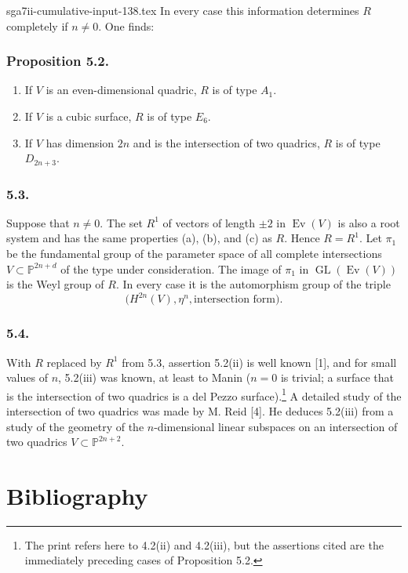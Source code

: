 \begin{filecontents*}{sga7ii-cumulative-input-138.tex}
In every case this information determines $R$ completely if $n\ne0$.  One
finds:

\subsubsection*{Proposition 5.2.}
\begin{enumerate}[label=(\roman*)]
\item If $V$ is an even-dimensional quadric, $R$ is of type $A_1$.
\item If $V$ is a cubic surface, $R$ is of type $E_6$.
\item If $V$ has dimension $2n$ and is the intersection of two quadrics,
  $R$ is of type $D_{2n+3}$.
\end{enumerate}

\subsubsection*{5.3.}
Suppose that $n\ne0$.  The set $R^1$ of vectors of length $\pm2$ in
$\operatorname{Ev}(V)$ is also a root system and has the same properties
(a), (b), and (c) as $R$.  Hence $R=R^1$.  Let $\pi_1$ be the fundamental
group of the parameter space of all complete intersections
$V\subset\mathbb P^{2n+d}$ of the type under consideration.  The image of
$\pi_1$ in $\operatorname{GL}(\operatorname{Ev}(V))$ is the Weyl group of
$R$.  In every case it is the automorphism group of the triple
\[
 \bigl(H^{2n}(V),\eta^n,\text{intersection form}\bigr).
\]

\subsubsection*{5.4.}
With $R$ replaced by $R^1$ from 5.3, assertion 5.2(ii) is well known [1],
and for small values of $n$, 5.2(iii) was known, at least to Manin
($n=0$ is trivial; a surface that is the intersection of two quadrics is a
del Pezzo surface).\footnote{The print refers here to 4.2(ii) and 4.2(iii),
but the assertions cited are the immediately preceding cases of
Proposition 5.2.}  A detailed study of the intersection of two quadrics was
made by M. Reid [4].  He deduces 5.2(iii) from a study of the geometry of
the $n$-dimensional linear subspaces on an intersection of two quadrics
$V\subset\mathbb P^{2n+2}$.

\section*{Bibliography}


\end{filecontents*}
